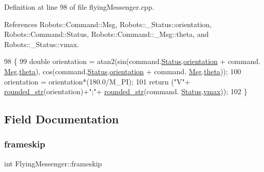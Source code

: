 Definition at line 98 of file flying\+Messenger.\+cpp.



References Robots\+::\+Command\+::\+Msg, Robots\+::\+\_\+\+Status\+::orientation, Robots\+::\+Command\+::\+Status, Robots\+::\+Command\+::\+\_\+\+Msg\+::theta, and Robots\+::\+\_\+\+Status\+::vmax.


\begin{DoxyCode}
98                                                            \{
99     \textcolor{keywordtype}{double} orientation = atan2(sin(command.\hyperlink{struct_robots_1_1_command_afdad6756a7987d5b8c76ea66fd681d10}{Status}.\hyperlink{struct_robots_1_1___status_ae7a5a28b09e25cf94607fc00b57f7c7e}{orientation} + command.
      \hyperlink{struct_robots_1_1_command_a598cda1f7d4b2879d8a1435ceebbc0db}{Msg}.\hyperlink{struct_robots_1_1_command_1_1___msg_a21599dd0707b283bf1ba1f25544bfb1d}{theta}), cos(command.\hyperlink{struct_robots_1_1_command_afdad6756a7987d5b8c76ea66fd681d10}{Status}.\hyperlink{struct_robots_1_1___status_ae7a5a28b09e25cf94607fc00b57f7c7e}{orientation} + command.
      \hyperlink{struct_robots_1_1_command_a598cda1f7d4b2879d8a1435ceebbc0db}{Msg}.\hyperlink{struct_robots_1_1_command_1_1___msg_a21599dd0707b283bf1ba1f25544bfb1d}{theta}));
100     orientation = orientation*(180.0/M\_PI);
101     \textcolor{keywordflow}{return} (\textcolor{stringliteral}{"V"}+ \hyperlink{class_flying_messenger_a687ff0844f83088397544fb7e9aab7cb}{rounded\_str}(orientation)+\textcolor{stringliteral}{";"}+ \hyperlink{class_flying_messenger_a687ff0844f83088397544fb7e9aab7cb}{rounded\_str}(command.
      \hyperlink{struct_robots_1_1_command_afdad6756a7987d5b8c76ea66fd681d10}{Status}.\hyperlink{struct_robots_1_1___status_a2d97c7aa10c75f32c10d25d0683450a3}{vmax}));
102 \}
\end{DoxyCode}


\subsection{Field Documentation}
\mbox{\label{class_flying_messenger_af2bf887194a8483cbadb5e27d2ec6b58}} 
\subsubsection{\texorpdfstring{frameskip}{frameskip}}
{\footnotesize\ttfamily int Flying\+Messenger\+::frameskip\hspace{0.3cm}{\ttfamily [private]}}



